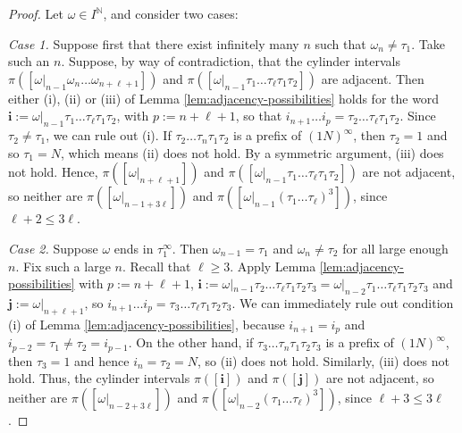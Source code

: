 \documentclass[11pt]{amsart}
\newcommand\NN{\mathbb{N}}
\newcommand{\1}{1}
\begin{document}
\begin{proof}
Let $\omega\in I^\NN$, and consider two cases:

{\em Case 1.} Suppose first that there exist infinitely many $n$ such that $\omega_{n}\neq\tau_1$. Take such an $n$. Suppose, by way of contradiction, that the cylinder intervals $\pi([\omega|_{n-1}\omega_{n}\dots\omega_{n+\ell+1}])$ and $\pi([\omega|_{n-1}\tau_1\dots\tau_\ell\tau_1\tau_2])$ are adjacent. Then either (i), (ii) or (iii) of Lemma \ref{lem:adjacency-possibilities} holds for the word $\mathbf{i}:=\omega|_{n-1}\tau_1\dots\tau_\ell\tau_1\tau_2$, with $p:=n+\ell+1$, so that $i_{n+1}\dots i_p=\tau_2\dots\tau_\ell\tau_1\tau_2$. Since $\tau_2\neq\tau_1$, we can rule out (i). If $\tau_2\dots\tau_n\tau_1\tau_2$ is a prefix of $(1N)^\infty$, then $\tau_2=1$ and so $\tau_1=N$, which means (ii) does not hold. By a symmetric argument, (iii) does not hold. Hence, $\pi([\omega|_{n+\ell+1}])$ and $\pi([\omega|_{n-1}\tau_1\dots\tau_\ell\tau_1\tau_2])$ are not adjacent, so neither are $\pi([\omega|_{n-1+3\ell}])$ and $\pi([\omega|_{n-1}(\tau_1\dots\tau_\ell)^3])$, since $\ell+2\leq 3\ell$.

{\em Case 2.} Suppose $\omega$ ends in $\tau_1^\infty$. Then $\omega_{n-1}=\tau_1$ and $\omega_n\neq\tau_2$ for all large enough $n$. Fix such a large $n$. Recall that $\ell\geq 3$. Apply Lemma \ref{lem:adjacency-possibilities} with $p:=n+\ell+1$, $\mathbf{i}:=\omega|_{n-1}\tau_2\dots\tau_\ell\tau_1\tau_2\tau_3=\omega|_{n-2}\tau_1\dots\tau_\ell\tau_1\tau_2\tau_3$ and $\mathbf{j}:=\omega|_{n+\ell+1}$, so $i_{n+1}\dots i_p=\tau_3\dots\tau_\ell\tau_1\tau_2\tau_3$. We can immediately rule out condition (i) of Lemma \ref{lem:adjacency-possibilities}, because $i_{n+1}=i_p$ and $i_{p-2}=\tau_1\neq\tau_2=i_{p-1}$. On the other hand, if $\tau_3\dots\tau_n\tau_1\tau_2\tau_3$ is a prefix of $(1N)^\infty$, then $\tau_3=1$ and hence $i_n=\tau_2=N$, so (ii) does not hold. Similarly, (iii) does not hold. Thus, the cylinder intervals $\pi([\mathbf{i}])$ and $\pi([\mathbf{j}])$ are not adjacent, so neither are $\pi([\omega|_{n-2+3\ell}])$ and $\pi([\omega|_{n-2}(\tau_1\dots\tau_\ell)^3])$, since $\ell+3\leq 3\ell$.

\end{proof}

\end{document}
